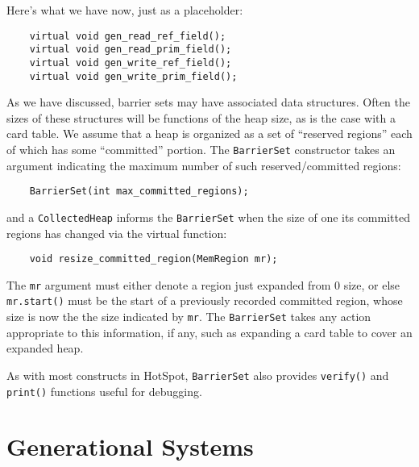 \documentclass{article}
\begin{document}
Here's what we have now, just as a placeholder:
\begin{verbatim}
    virtual void gen_read_ref_field();
    virtual void gen_read_prim_field();
    virtual void gen_write_ref_field();
    virtual void gen_write_prim_field();
\end{verbatim}


As we have discussed, barrier sets may have associated data
structures.  Often the sizes of these structures will be functions of
the heap size, as is the case with a card table.  We assume that a
heap is organized as a set of ``reserved regions'' each of which has
some ``committed'' portion.  The {\tt BarrierSet} constructor takes an
argument indicating the maximum number of such reserved/committed
regions:
\begin{verbatim}
    BarrierSet(int max_committed_regions);
\end{verbatim}
and a {\tt CollectedHeap} informs the {\tt BarrierSet} when the size
of one its committed regions has changed via the virtual function:
\begin{verbatim}
    void resize_committed_region(MemRegion mr);
\end{verbatim}
The {\tt mr} argument must either denote a region just expanded from
0 size, or else {\tt mr.start()} must be the start of a previously
recorded committed region, whose size is now the the size indicated by
{\tt mr}.  The {\tt BarrierSet} takes any action appropriate to this
information, if any, such as expanding a card table to cover an
expanded heap.

As with most constructs in HotSpot, {\tt BarrierSet} also provides
{\tt verify()} and {\tt print()} functions useful for debugging. 

\section{Generational Systems}
\label{s:gen}
\end{document}
